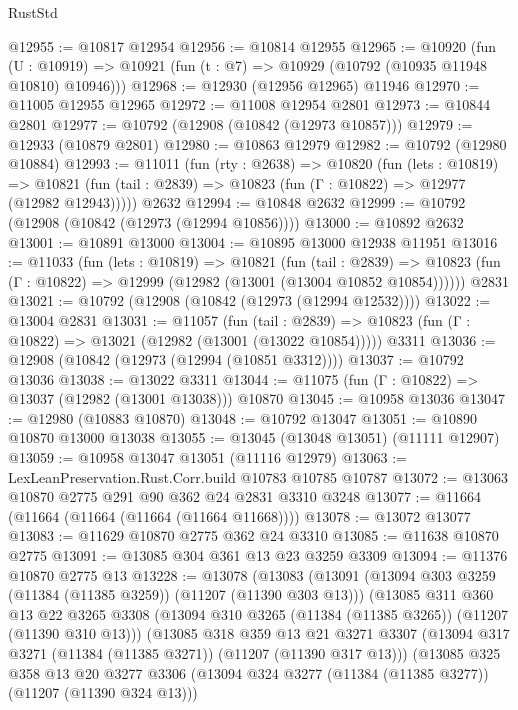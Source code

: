 \begin{lexlean}{RustStd}
\begin{coremodule}
@12955 := @10817 @12954
@12956 := @10814 @12955
@12965 := @10920
    (fun (U : @10919) => @10921 (fun (t : @7) => @10929 (@10792 (@10935 @11948 @10810) @10946)))
@12968 := @12930 (@12956 @12965) @11946
@12970 := @11005 @12955 @12965
@12972 := @11008 @12954 @2801
@12973 := @10844 @2801
@12977 := @10792 (@12908 (@10842 (@12973 @10857)))
@12979 := @12933 (@10879 @2801)
@12980 := @10863 @12979
@12982 := @10792 (@12980 @10884)
@12993 := @11011
    (fun (rty : @2638) =>
    @10820
      (fun (lets : @10819) =>
      @10821 (fun (tail : @2839) => @10823 (fun (Γ : @10822) => @12977 (@12982 @12943)))))
    @2632
@12994 := @10848 @2632
@12999 := @10792 (@12908 (@10842 (@12973 (@12994 @10856))))
@13000 := @10892 @2632
@13001 := @10891 @13000
@13004 := @10895 @13000 @12938 @11951
@13016 := @11033
    (fun (lets : @10819) =>
    @10821
      (fun (tail : @2839) =>
      @10823 (fun (Γ : @10822) => @12999 (@12982 (@13001 (@13004 @10852 @10854))))))
    @2831
@13021 := @10792 (@12908 (@10842 (@12973 (@12994 @12532))))
@13022 := @13004 @2831
@13031 := @11057
    (fun (tail : @2839) => @10823 (fun (Γ : @10822) => @13021 (@12982 (@13001 (@13022 @10854)))))
    @3311
@13036 := @12908 (@10842 (@12973 (@12994 (@10851 @3312))))
@13037 := @10792 @13036
@13038 := @13022 @3311
@13044 := @11075 (fun (Γ : @10822) => @13037 (@12982 (@13001 @13038))) @10870
@13045 := @10958 @13036
@13047 := @12980 (@10883 @10870)
@13048 := @10792 @13047
@13051 := @10890 @10870 @13000 @13038
@13055 := @13045 (@13048 @13051) (@11111 @12907)
@13059 := @10958 @13047 @13051 (@11116 @12979)
@13063 := LexLeanPreservation.Rust.Corr.build @10783 @10785 @10787
@13072 := @13063 @10870 @2775 @291 @90 @362 @24 @2831 @3310 @3248
@13077 := @11664 (@11664 (@11664 (@11664 (@11664 @11668))))
@13078 := @13072 @13077
@13083 := @11629 @10870 @2775 @362 @24 @3310
@13085 := @11638 @10870 @2775
@13091 := @13085 @304 @361 @13 @23 @3259 @3309
@13094 := @11376 @10870 @2775 @13
@13228 := @13078
    (@13083
      (@13091
        (@13094 @303 @3259 (@11384 (@11385 @3259)) (@11207 (@11390 @303 @13)))
        (@13085
          @311
          @360
          @13
          @22
          @3265
          @3308
          (@13094 @310 @3265 (@11384 (@11385 @3265)) (@11207 (@11390 @310 @13)))
          (@13085
            @318
            @359
            @13
            @21
            @3271
            @3307
            (@13094 @317 @3271 (@11384 (@11385 @3271)) (@11207 (@11390 @317 @13)))
            (@13085
              @325
              @358
              @13
              @20
              @3277
              @3306
              (@13094 @324 @3277 (@11384 (@11385 @3277)) (@11207 (@11390 @324 @13)))

\end{coremodule}
\end{lexlean}
